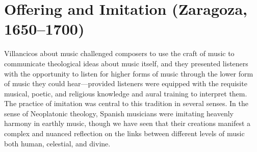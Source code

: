 


\chapter{Offering and Imitation (Zaragoza, 1650--1700)}
\label{ch:zaragoza}

Villancicos about music challenged composers to use the craft of music to
communicate theological ideas about music itself, and they presented listeners
with the opportunity to listen for higher forms of music through the lower form
of music they could hear---provided listeners were equipped with the requisite
musical, poetic, and religious knowledge and aural training to interpret them.
The practice of imitation was central to this tradition in several senses. 
In the sense of Neoplatonic theology, Spanish musicians were imitating heavenly
harmony in earthly music, though we have seen that their creations manifest a
complex and nuanced reflection on the links between different levels of music
both human, celestial, and divine.

